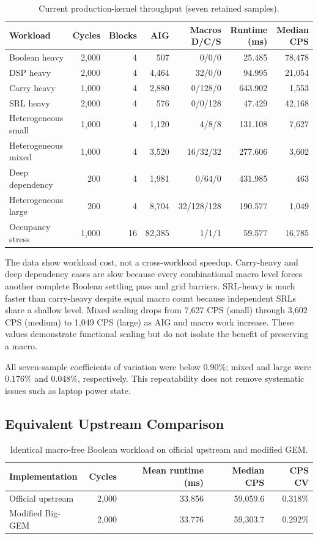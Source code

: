 \documentclass[11pt,a4paper]{article}
\newcommand{\code}[1]{\texttt{\detokenize{#1}}}
\begin{document}
\begin{table}[H]
\centering
\caption{Current production-kernel throughput (seven retained samples).}
\small
\begin{tabularx}{\textwidth}{P{34mm} r r r r r r}
\toprule
Workload & Cycles & Blocks & AIG & Macros D/C/S & Runtime (ms) & Median CPS \\
\midrule
Boolean heavy & 2,000 & 4 & 507 & 0/0/0 & 25.485 & 78,478 \\
DSP heavy & 2,000 & 4 & 4,464 & 32/0/0 & 94.995 & 21,054 \\
Carry heavy & 1,000 & 4 & 2,880 & 0/128/0 & 643.902 & 1,553 \\
SRL heavy & 2,000 & 4 & 576 & 0/0/128 & 47.429 & 42,168 \\
Heterogeneous small & 1,000 & 4 & 1,120 & 4/8/8 & 131.108 & 7,627 \\
Heterogeneous mixed & 1,000 & 4 & 3,520 & 16/32/32 & 277.606 & 3,602 \\
Deep dependency & 200 & 4 & 1,981 & 0/64/0 & 431.985 & 463 \\
Heterogeneous large & 200 & 4 & 8,704 & 32/128/128 & 190.577 & 1,049 \\
Occupancy stress & 1,000 & 16 & 82,385 & 1/1/1 & 59.577 & 16,785 \\
\bottomrule
\end{tabularx}
\end{table}

The data show workload cost, not a cross-workload speedup.  Carry-heavy and deep
dependency cases are slow because every combinational macro level forces another
complete Boolean settling pass and grid barriers.  SRL-heavy is much faster than
carry-heavy despite equal macro count because independent SRLs share a shallow
level.  Mixed scaling drops from 7,627 CPS (small) through 3,602 CPS (medium) to
1,049 CPS (large) as AIG and macro work increase.  These values demonstrate
functional scaling but do not isolate the benefit of preserving a macro.

All seven-sample coefficients of variation were below 0.90\%; mixed and large
were 0.176\% and 0.048\%, respectively.  This repeatability does not remove
systematic issues such as laptop power state.

\subsection{Equivalent Upstream Comparison}

\begin{table}[H]
\centering
\caption{Identical macro-free Boolean workload on official upstream and modified GEM.}
\begin{tabularx}{\textwidth}{P{43mm} r r r r}
\toprule
Implementation & Cycles & Mean runtime (ms) & Median CPS & CPS CV \\
\midrule
Official upstream \code{9e913f9} & 2,000 & 33.856 & 59,059.6 & 0.318\% \\
Modified Big-GEM \code{8c48130} & 2,000 & 33.776 & 59,303.7 & 0.292\% \\
\bottomrule
\end{tabularx}
\end{table}
\end{document}
